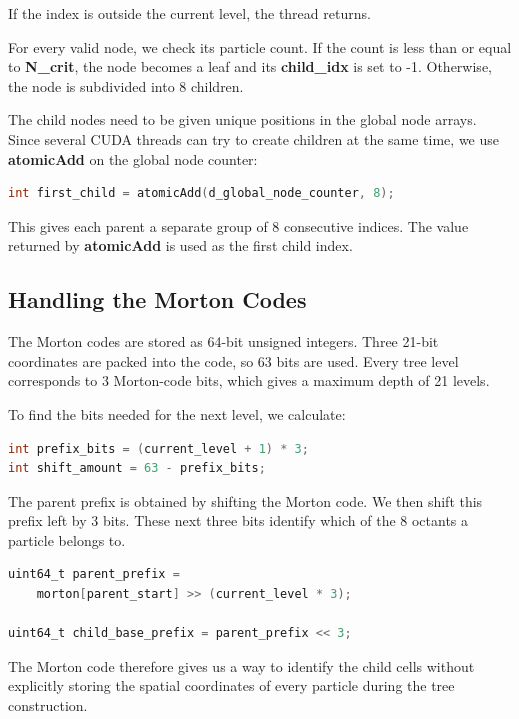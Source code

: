 If the index is outside the current level, the thread returns.

For every valid node, we check its particle count. If the count is less than or equal to \textbf{N\_crit}, the node becomes a leaf and its \textbf{child\_idx} is set to -1. Otherwise, the node is subdivided into 8 children.

The child nodes need to be given unique positions in the global node arrays. Since several CUDA threads can try to create children at the same time, we use \textbf{atomicAdd} on the global node counter:

\begin{lstlisting}[language=C]
int first_child = atomicAdd(d_global_node_counter, 8);
\end{lstlisting}

This gives each parent a separate group of 8 consecutive indices. The value returned by \textbf{atomicAdd} is used as the first child index.

\subsection{Handling the Morton Codes}

The Morton codes are stored as 64-bit unsigned integers. Three 21-bit coordinates are packed into the code, so 63 bits are used. Every tree level corresponds to 3 Morton-code bits, which gives a maximum depth of 21 levels.

To find the bits needed for the next level, we calculate:

\begin{lstlisting}[language=C]
int prefix_bits = (current_level + 1) * 3;
int shift_amount = 63 - prefix_bits;
\end{lstlisting}

The parent prefix is obtained by shifting the Morton code. We then shift this prefix left by 3 bits. These next three bits identify which of the 8 octants a particle belongs to.

\begin{lstlisting}[language=C]
uint64_t parent_prefix =
    morton[parent_start] >> (current_level * 3);

uint64_t child_base_prefix = parent_prefix << 3;
\end{lstlisting}

The Morton code therefore gives us a way to identify the child cells without explicitly storing the spatial coordinates of every particle during the tree construction.


